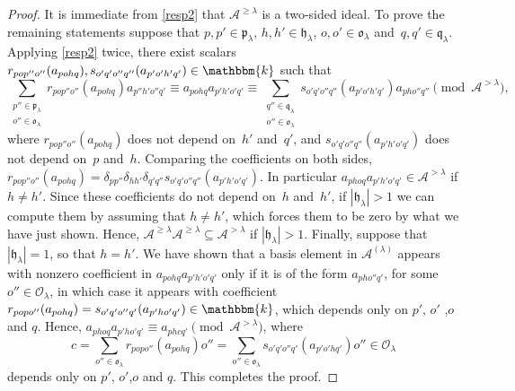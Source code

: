 \documentclass[a4paper,11pt]{amsart}
\numberwithin{equation}{subsection}
\theoremstyle{definition}
\theoremstyle{theorem}
\theoremstyle{remark}
\newcommand\CA{\mathcal{A}}
\newcommand\CO{\mathcal{O}}
\newcommand\plam[1][\lambda]{\mathfrak{p}_{#1}}
\newcommand\hlam[1][\lambda]{\mathfrak{h}_{#1}}
\newcommand\qlam[1][\lambda]{\mathfrak{q}_{#1}}
\newcommand\Olam[1][\lambda]{\CO_{#1}}
\newcommand\olam[1][\lambda]{\mathfrak{o}_{#1}}
\newcommand\kk{\mathbbm{k}}
\begin{document}
\begin{proof}
 It is immediate from \autoref{resp2} that $\CA^{\ge\lambda}$ is a
 two-sided ideal. To prove the remaining statements suppose that
 $p,p'\in\plam$, $h,h'\in\hlam$, $o,o'\in\olam$ and~$q,q'\in\qlam$.
 Applying \autoref{resp2} twice, there exist scalars
 $r_{pop''o''}(a_{pohq}),s_{o'q'o''q''}(a_{p'o'h'q'})\in\kk$ such that
 \[
       \sum_{\substack{p''\in\plam\\o''\in\olam}}
          r_{pop''o''}(a_{pohq})a_{p''h'o''q'}
        \equiv a_{pohq}a_{p'h'o'q'}
        \equiv \sum_{\substack{q''\in\qlam\\o''\in\olam}}
          s_{o'q'o''q''}(a_{p'o'h'q'})a_{pho''q''}
        \pmod{\CA^{>\lambda}},
 \]
 where $r_{pop''o''}(a_{pohq})$ does not depend on~$h'$ and~$q'$, and
 $s_{o'q'o''q''}(a_{p'h'o'q'})$ does not depend on~$p$ and~$h$. Comparing
 the coefficients on both sides,
 $r_{pop''o''}(a_{pohq})=\delta_{pp''}\delta_{hh'}\delta_{q'q''}
    s_{o'q'o''q''}(a_{p'h'o'q'})$.
 In particular $a_{phoq}a_{p'h'o'q'}\in\CA^{>\lambda}$ if $h\ne h'$.
 Since these coefficients do not depend on~$h$ and~$h'$, if $|\hlam|>1$
 we can compute them by assuming that $h\ne h'$, which forces them to be
 zero by what we have just shown. Hence,
 $\CA^{\ge\lambda}\CA^{\ge\lambda}\subseteq\CA^{>\lambda}$ if
 $|\hlam|>1$. Finally, suppose that $|\hlam|=1$, so that $h=h'$. We have
 shown that a basis element in $\CA^{(\lambda)}$ appears with nonzero
 coefficient in $a_{pohq}a_{p'h'o'q'}$ only if it is of the form
 $a_{pho''q'}$, for some $o''\in\Olam$, in which case it appears with
 coefficient $r_{popo''}(a_{pohq})=s_{o'q'o''q'}(a_{p'ho'q'})\in\kk$,
 which depends only on $p'$, $o'$ ,$o$ and $q$. Hence,
 $a_{phoq}a_{p'ho'q'}\equiv a_{phcq'}\pmod{\CA^{>\lambda}}$, where
 \[
   c = \sum_{o''\in\olam}r_{popo''}(a_{pohq})o''
     = \sum_{o''\in\olam}s_{o'q'o''q'}(a_{p'o'hq'})o''\in\Olam
 \]
 depends only on $p'$, $o'$,$o$ and $q$. This completes the proof.
 \end{proof}
\end{document}
